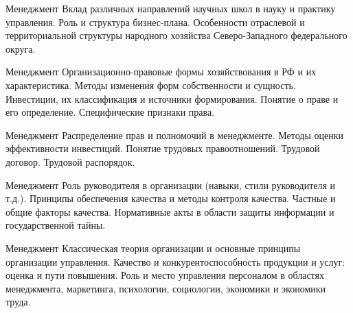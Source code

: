\documentclass[
	11pt,
	a4paper,
	]
	{article}
\begin{document}
\vfill



\begin{minipage}[t][\miniH]{\miniL}\centering
	 {Менеджмент}
		{
			Вклад различных направлений научных школ в науку и практику управления.
		}{
			Роль и структура бизнес-плана.
		}{
			Особенности отраслевой и территориальной структуры народного хозяйства Северо-Западного федерального округа.
		}
	\lowGE
\end{minipage}





\begin{minipage}[t][\miniH]{\miniL}\centering
	 {Менеджмент}
		{
			Организационно-правовые формы хозяйствования в РФ и их характеристика. Методы изменения форм собственности и сущность.
		}{
			Инвестиции, их классификация и источники формирования.
		}{
			Понятие о праве и его определение. Специфические признаки права.
		}
	\lowGE
\end{minipage}

\vfill



\begin{minipage}[t][\miniH]{\miniL}\centering
	 {Менеджмент}
		{
			Распределение прав и полномочий в менеджменте.
		}{
			Методы оценки эффективности инвестиций.
		}{
			Понятие трудовых правоотношений. Трудовой договор. Трудовой распорядок.
		}
	\lowGE
\end{minipage}

\vfill



\begin{minipage}[t][\miniH]{\miniL}\centering
	 {Менеджмент}
		{
			Роль руководителя в организации (навыки, стили руководителя и т.д.).
		}{
			Принципы обеспечения качества и методы контроля качества. Частные и общие факторы качества.
		}{
			Нормативные акты в области защиты информации и государственной тайны.
		}
	\lowGE
\end{minipage}





\begin{minipage}[t][\miniH]{\miniL}\centering
	 {Менеджмент}
		{
			Классическая теория организации и основные принципы организации управления.
		}{
			Качество и конкурентоспособность продукции и услуг: оценка и пути повышения.
		}{
			Роль и место управления персоналом в областях менеджмента, маркетинга, психологии, социологии, экономики и экономики труда.
		}
	\lowGE
\end{minipage}
\end{document}
